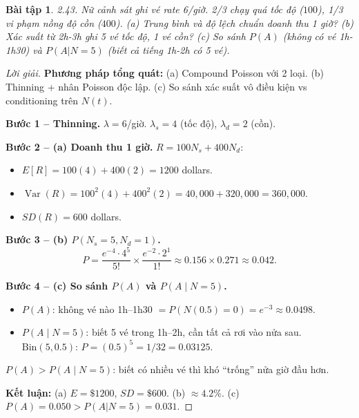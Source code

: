 \documentclass[8pt,a4paper]{article}
\newtheorem{exercise}{Bài tập}
\newenvironment{solution}{\begin{proof}[Lời giải]}{\end{proof}}
\newcommand{\Var}{\operatorname{Var}}
\begin{document}
\begin{exercise}
2.43. Nữ cảnh sát ghi vé rate 6/giờ. 2/3 chạy quá tốc độ ($100$), 1/3 vi phạm nồng độ cồn ($400$).
(a) Trung bình và độ lệch chuẩn doanh thu 1 giờ? (b) Xác suất từ 2h-3h ghi 5 vé tốc độ, 1 vé cồn? (c) So sánh $P(A)$ (không có vé 1h-1h30) và $P(A|N=5)$ (biết cả tiếng 1h-2h có 5 vé).
\end{exercise}
\begin{solution}
\textbf{Phương pháp tổng quát:} (a) Compound Poisson với 2 loại. (b) Thinning + nhân Poisson độc lập. (c) So sánh xác suất vô điều kiện vs conditioning trên $N(t)$.

\textbf{Bước 1 -- Thinning.} $\lambda = 6$/giờ. $\lambda_s = 4$ (tốc độ), $\lambda_d = 2$ (cồn).

\textbf{Bước 2 -- (a) Doanh thu 1 giờ.} $R = 100 N_s + 400 N_d$:
\begin{itemize}[nosep]
  \item $E[R] = 100(4) + 400(2) = \boxed{1200}$ dollars.
  \item $\Var(R) = 100^2(4) + 400^2(2) = 40{,}000 + 320{,}000 = 360{,}000$.
  \item $SD(R) = \boxed{600}$ dollars.
\end{itemize}

\textbf{Bước 3 -- (b) $P(N_s = 5, N_d = 1)$.}
\[
  P = \frac{e^{-4} \cdot 4^5}{5!} \times \frac{e^{-2} \cdot 2^1}{1!} \approx 0.156 \times 0.271 \approx \boxed{0.042}.
\]

\textbf{Bước 4 -- (c) So sánh $P(A)$ và $P(A \mid N=5)$.}
\begin{itemize}[nosep]
  \item $P(A)$: không vé nào 1h--1h30 $= P(N(0.5) = 0) = e^{-3} \approx 0.0498$.
  \item $P(A \mid N=5)$: biết 5 vé trong 1h--2h, cần tất cả rơi vào nửa sau. $\text{Bin}(5, 0.5)$:
  $P = (0.5)^5 = 1/32 = 0.03125$.
\end{itemize}
$\boxed{P(A) > P(A \mid N=5)}$: biết có nhiều vé thì khó ``trống'' nửa giờ đầu hơn.

\textbf{Kết luận:} (a) $E = \$1200$, $SD = \$600$. (b) $\approx 4.2\%$. (c) $P(A) = 0.050 > P(A|N=5) = 0.031$.
\end{solution}
\end{document}
